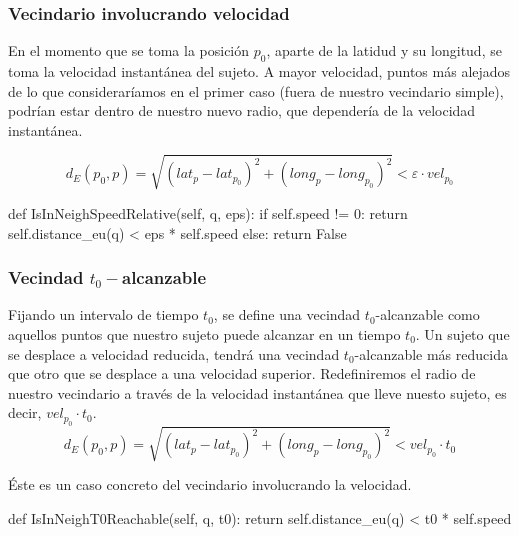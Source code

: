 \documentclass[10pt, spanish]{beamer}
\begin{document}
\begin{frame}[fragile]
\frametitle{Vecindario involucrando velocidad}

En el momento que se toma la posici\'on $p_0$, aparte de la latidud y su longitud, se toma la velocidad instant\'anea del sujeto.
A mayor velocidad, puntos m\'as alejados de lo que considerar\'iamos en el primer caso (fuera de nuestro vecindario simple), podr\'ian estar dentro de nuestro nuevo radio, que depender\'ia de la velocidad instant\'anea.

$$ d_E(p_0, p) = \sqrt{(lat_{p} - lat_{p_0})^2 + (long_{p} - long_{p_0})^2 } < \varepsilon \cdot vel_{p_0} $$

\bigskip
\begin{python}
    def IsInNeighSpeedRelative(self, q, eps):
	if self.speed != 0:
	    return self.distance_eu(q) < eps * self.speed	
	else:
	    return False
\end{python}

\end{frame}
\begin{frame}[fragile]
\frametitle{Vecindad $t_0-$alcanzable}

Fijando un intervalo de tiempo $t_0$, se define una vecindad $t_0$-alcanzable como aquellos puntos que nuestro sujeto puede alcanzar en un tiempo $t_0$. Un sujeto que se desplace a velocidad reducida, tendr\'a una vecindad $t_0$-alcanzable m\'as reducida que otro que se desplace a una velocidad superior. Redefiniremos el radio de nuestro vecindario a trav\'es de la velocidad instant\'anea que lleve nuesto sujeto, es decir, $vel_{p_0}\cdot t_0$.  \\

$$ d_E(p_0, p) = \sqrt{(lat_{p} - lat_{p_0})^2 + (long_{p} - long_{p_0})^2 } < vel_{p_0} \cdot t_0 $$

\'Este es un caso concreto del vecindario involucrando la velocidad. \\

\bigskip
\begin{python}
    def IsInNeighT0Reachable(self, q, t0):
	return self.distance_eu(q) < t0 * self.speed
\end{python}

\end{frame}
\end{document}
